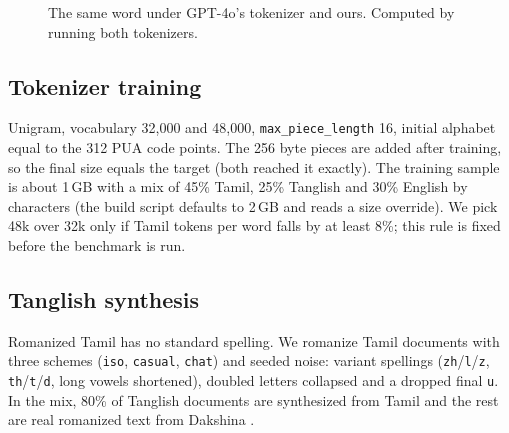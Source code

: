 \documentclass[11pt]{article}
\newcommand{\ta}[1]{{\tamilfont #1}}
\begin{document}
\begin{figure}[t]
\centering
{}
\caption{The same word under GPT-4o's tokenizer and ours. Computed by running both tokenizers.}
\label{fig:example}
\end{figure}

\subsection{Tokenizer training}
Unigram, vocabulary 32,000 and 48,000, \texttt{max\_piece\_length} 16, initial alphabet equal to the 312 PUA code points.
The 256 byte pieces are added after training, so the final size equals the target (both reached it exactly).
The training sample is about 1\,GB with a mix of 45\% Tamil, 25\% Tanglish and 30\% English by characters (the build script defaults to 2\,GB and reads a size override).
We pick 48k over 32k only if Tamil tokens per word falls by at least 8\%; this rule is fixed before the benchmark is run.

\subsection{Tanglish synthesis}
Romanized Tamil has no standard spelling.
We romanize Tamil documents with three schemes (\texttt{iso}, \texttt{casual}, \texttt{chat}) and seeded noise: variant spellings (\texttt{zh}/\texttt{l}/\texttt{z}, \texttt{th}/\texttt{t}/\texttt{d}, long vowels shortened), doubled letters collapsed and a dropped final \texttt{u}.
In the mix, 80\% of Tanglish documents are synthesized from Tamil and the rest are real romanized text from Dakshina \cite{roark2020dakshina}.
\end{document}
